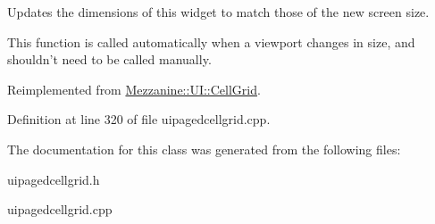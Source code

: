 Updates the dimensions of this widget to match those of the new screen size. 

This function is called automatically when a viewport changes in size, and shouldn't need to be called manually. 

Reimplemented from \hyperlink{classMezzanine_1_1UI_1_1CellGrid_a11cda11f70cd331c9bd39daf0b0f24aa}{Mezzanine::UI::CellGrid}.



Definition at line 320 of file uipagedcellgrid.cpp.



The documentation for this class was generated from the following files:\begin{DoxyCompactItemize}
\item 
uipagedcellgrid.h\item 
uipagedcellgrid.cpp\end{DoxyCompactItemize}
